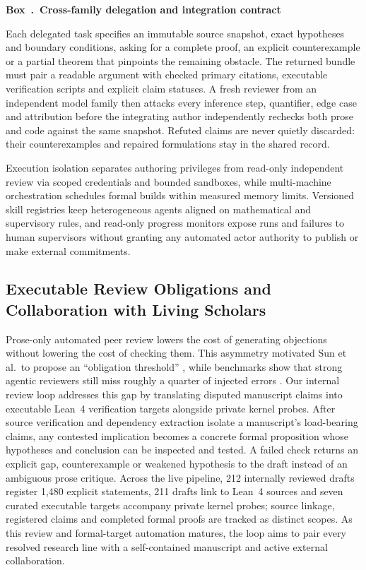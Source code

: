 \documentclass[11pt,a4paper]{article}
\newcounter{protocolbox}
\newenvironment{protocol}[1]{\refstepcounter{protocolbox}\begin{framed}\noindent\textbf{Box~\theprotocolbox.\ #1}\par\small}{\end{framed}}
\begin{document}
\noindent\begin{minipage}{\linewidth}
\begin{protocol}{Cross-family delegation and integration contract}
\label{box:delegate}
Each delegated task specifies an immutable source snapshot, exact hypotheses
and boundary conditions, asking for a complete proof, an explicit
counterexample or a partial theorem that pinpoints the remaining obstacle. The
returned bundle must pair a readable argument with checked primary citations,
executable verification scripts and explicit claim statuses. A fresh reviewer
from an independent model family then attacks every inference step, quantifier,
edge case and attribution before the integrating author independently rechecks
both prose and code against the same snapshot. Refuted claims are never quietly
discarded: their counterexamples and repaired formulations stay in the shared
record.
\end{protocol}
\end{minipage}

Execution isolation separates authoring privileges from read-only independent
review via scoped credentials and bounded sandboxes, while multi-machine
orchestration schedules formal builds within measured memory limits. Versioned
skill registries keep heterogeneous agents aligned on mathematical and
supervisory rules, and read-only progress monitors expose runs and failures to
human supervisors without granting any automated actor authority to publish or
make external commitments.

\subsection{Executable Review Obligations and Collaboration with Living Scholars}
\label{sec:feedback}
Prose-only automated peer review lowers the cost of generating objections
without lowering the cost of checking them. This asymmetry motivated Sun et
al.\ to propose an ``obligation threshold'' \citep{sun2026obligation}, while
benchmarks show that strong agentic reviewers still miss roughly a quarter of
injected errors \citep{stanford,nguyen2026review,scholarpeer}. Our internal
review loop addresses this gap by translating disputed manuscript claims into
executable Lean~4 verification targets alongside private kernel probes. After
source verification and dependency extraction isolate a manuscript's
load-bearing claims, any contested implication becomes a concrete formal
proposition whose hypotheses and conclusion can be inspected and tested. A
failed check returns an explicit gap, counterexample or weakened hypothesis to
the draft instead of an ambiguous prose critique. Across the live pipeline, 212
internally reviewed drafts register 1,480 explicit statements, 211 drafts link
to Lean~4 sources and seven curated executable targets accompany private kernel
probes; source linkage, registered claims and completed formal proofs are
tracked as distinct scopes. As this review and formal-target automation
matures, the loop aims to pair every resolved research line with a
self-contained manuscript and active external collaboration.
\end{document}
